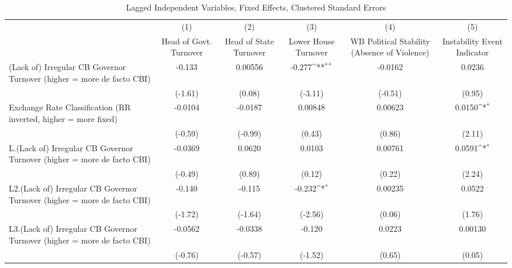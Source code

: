 {
\def\sym#1{\ifmmode^{#1}\else\(^{#1}\)\fi}
\begin{longtable}{l*{5}{c}}
\caption{Lagged Independent Variables, Fixed Effects, Clustered Standard Errors \label{lagsDF}}\\
\hline\hline\endfirsthead\hline\endhead\hline\endfoot\endlastfoot
                &\multicolumn{1}{c}{(1)}&\multicolumn{1}{c}{(2)}&\multicolumn{1}{c}{(3)}&\multicolumn{1}{c}{(4)}&\multicolumn{1}{c}{(5)}\\
                &\multicolumn{1}{c}{Head of Govt. Turnover}&\multicolumn{1}{c}{Head of State Turnover}&\multicolumn{1}{c}{Lower House Turnover}&\multicolumn{1}{c}{WB Political Stability (Absence of Violence)}&\multicolumn{1}{c}{Instability Event Indicator}\\
\hline
(Lack of) Irregular CB Governor Turnover (higher = more de facto CBI)&   -0.133         &  0.00556         &   -0.277\sym{**} &  -0.0162         &   0.0236         \\
                &  (-1.61)         &   (0.08)         &  (-3.11)         &  (-0.51)         &   (0.95)         \\
[1em]
Exchange Rate Classification (RR inverted, higher = more fixed)&  -0.0104         &  -0.0187         &  0.00848         &  0.00623         &   0.0150\sym{*}  \\
                &  (-0.59)         &  (-0.99)         &   (0.43)         &   (0.86)         &   (2.11)         \\
[1em]
L.(Lack of) Irregular CB Governor Turnover (higher = more de facto CBI)&  -0.0369         &   0.0620         &   0.0103         &  0.00761         &   0.0591\sym{*}  \\
                &  (-0.49)         &   (0.89)         &   (0.12)         &   (0.22)         &   (2.24)         \\
[1em]
L2.(Lack of) Irregular CB Governor Turnover (higher = more de facto CBI)&   -0.140         &   -0.115         &   -0.232\sym{*}  &  0.00235         &   0.0522         \\
                &  (-1.72)         &  (-1.64)         &  (-2.56)         &   (0.06)         &   (1.76)         \\
[1em]
L3.(Lack of) Irregular CB Governor Turnover (higher = more de facto CBI)&  -0.0562         &  -0.0338         &   -0.120         &   0.0223         &  0.00130         \\
                &  (-0.76)         &  (-0.57)         &  (-1.52)         &   (0.65)         &   (0.05)         \\

\end{longtable}}
